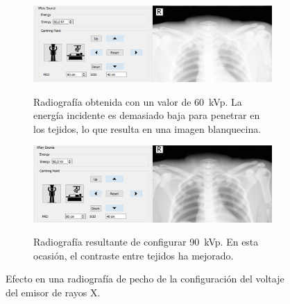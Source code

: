 \begin{figure}[ht]
    \begin{subfigure}[b]{0.9\linewidth}
        \centering
        {\includegraphics[width=\linewidth]{IMG/60kvp.png}}
        \caption{Radiografía obtenida con un valor de 60~\acs{kVp}.  La energía incidente es demasiado baja para penetrar en los tejidos, lo que resulta en una imagen blanquecina.\label{fig:60kvp}}
    \end{subfigure}
    
     \begin{subfigure}[b]{0.9\linewidth}
        \centering
        {\includegraphics[width=\linewidth]{IMG/90kvp.png}}
        \caption{ Radiografía resultante de configurar 90~\acs{kVp}. En esta ocasión, el contraste entre tejidos ha mejorado.\label{fig:90kvp}}
    \end{subfigure}
    \caption{Efecto en una radiografía de pecho de la configuración del voltaje del emisor de rayos X. \label{fig:setup}}
   \end{figure}
   


  
